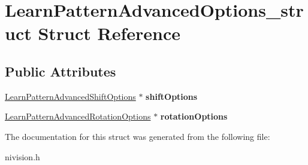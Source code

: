 \hypertarget{structLearnPatternAdvancedOptions__struct}{\section{\-Learn\-Pattern\-Advanced\-Options\-\_\-struct \-Struct \-Reference}
\label{structLearnPatternAdvancedOptions__struct}
}
\subsection*{\-Public \-Attributes}
\begin{DoxyCompactItemize}
\item 
\hypertarget{structLearnPatternAdvancedOptions__struct_ad4a7b5db40f74f337bbad5a220b6f583}{\hyperlink{structLearnPatternAdvancedShiftOptions__struct}{\-Learn\-Pattern\-Advanced\-Shift\-Options} $\ast$ {\bfseries shift\-Options}}\label{structLearnPatternAdvancedOptions__struct_ad4a7b5db40f74f337bbad5a220b6f583}

\item 
\hypertarget{structLearnPatternAdvancedOptions__struct_afd145518c6b5e59905f1381e5f5846e6}{\hyperlink{structLearnPatternAdvancedRotationOptions__struct}{\-Learn\-Pattern\-Advanced\-Rotation\-Options} $\ast$ {\bfseries rotation\-Options}}\label{structLearnPatternAdvancedOptions__struct_afd145518c6b5e59905f1381e5f5846e6}

\end{DoxyCompactItemize}


\-The documentation for this struct was generated from the following file\-:\begin{DoxyCompactItemize}
\item 
nivision.\-h\end{DoxyCompactItemize}
